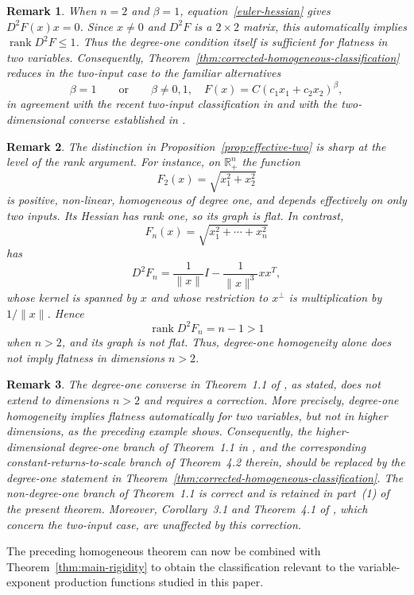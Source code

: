 \documentclass[12pt]{amsart}
\newtheorem{remark}{Remark}[section]
\begin{document}
\begin{remark}\label{rem:two-input-classification}
When $n=2$ and $\beta=1$, equation~\eqref{euler-hessian} gives $D^2F(x)x=0$. Since $x\ne0$ and $D^2F$ is a $2\times2$ matrix, this automatically implies $\operatorname{rank}D^2F\le1$. Thus the degree-one condition itself is sufficient for flatness in two variables. Consequently, Theorem~\ref{thm:corrected-homogeneous-classification} reduces in the two-input case to the familiar alternatives
\[
 \beta=1
 \qquad\text{or}\qquad
 \beta\ne0,1,\quad F(x)=C(c_1x_1+c_2x_2)^\beta,
\]
in agreement with the recent two-input classification in \cite{Previous2D} and with the two-dimensional converse established in \cite{CV2013}.
\end{remark}

\begin{remark}
The distinction in Proposition~\ref{prop:effective-two} is sharp at the level of the rank argument. For instance, on $\mathbb R_+^n$ the function
\[
 F_2(x)=\sqrt{x_1^2+x_2^2}
\]
is positive, non-linear, homogeneous of degree one, and depends effectively on only two inputs. Its Hessian has rank one, so its graph is flat. In contrast,
\[
 F_n(x)=\sqrt{x_1^2+\cdots+x_n^2}
\]
has
\[
 D^2F_n=\frac1{\|x\|}I-\frac1{\|x\|^3}xx^T,
\]
whose kernel is spanned by $x$ and whose restriction to $x^\perp$ is multiplication by $1/\|x\|$. Hence
\[
 \operatorname{rank}D^2F_n=n-1>1
\]
when $n>2$, and its graph is not flat. Thus, degree-one homogeneity alone does not imply flatness in
dimensions $n>2$.
\end{remark}

\begin{remark}
The degree-one converse in Theorem~1.1 of \cite{CV2013}, as stated, does not extend to dimensions \(n>2\) and requires a correction. More precisely, degree-one homogeneity implies
flatness automatically for two variables, but not in higher
dimensions, as the preceding example shows. Consequently, the
higher-dimensional degree-one branch of Theorem~1.1 in \cite{CV2013}, and
the corresponding constant-returns-to-scale branch of Theorem~4.2 therein,
should be replaced by the degree-one statement in
Theorem~\ref{thm:corrected-homogeneous-classification}. The non-degree-one
branch of Theorem~1.1 is correct and is retained in part~(1) of the present theorem.
Moreover, Corollary~3.1 and Theorem~4.1 of \cite{CV2013}, which concern the
two-input case, are unaffected by this correction.
\end{remark}

The preceding homogeneous theorem can now be combined with
Theorem~\ref{thm:main-rigidity} to obtain the classification
relevant to the variable-exponent production functions studied in this
paper.
\end{document}
